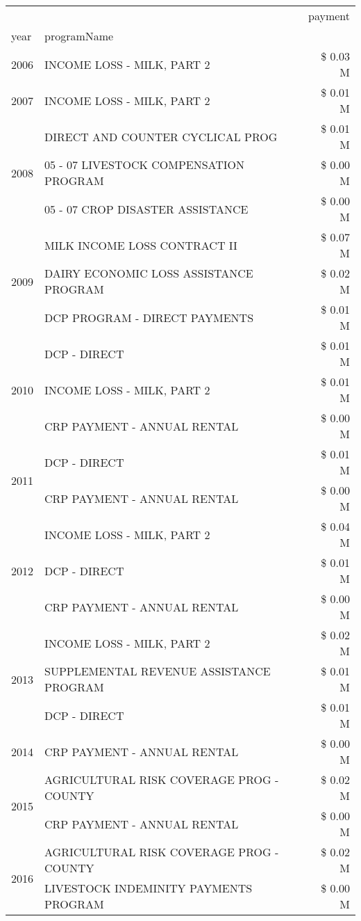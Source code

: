 \begin{tabular}{llr}
\toprule
 &  & payment \\
year & programName &  \\
\midrule
2006 & INCOME LOSS - MILK, PART 2 & \$ 0.03 M \\
\cline{1-3}
2007 & INCOME LOSS - MILK, PART 2 & \$ 0.01 M \\
\cline{1-3}
\multirow[t]{3}{*}{2008} & DIRECT AND COUNTER CYCLICAL PROG & \$ 0.01 M \\
 & 05 - 07 LIVESTOCK COMPENSATION PROGRAM & \$ 0.00 M \\
 & 05 - 07 CROP DISASTER ASSISTANCE & \$ 0.00 M \\
\cline{1-3}
\multirow[t]{3}{*}{2009} & MILK INCOME LOSS CONTRACT II & \$ 0.07 M \\
 & DAIRY ECONOMIC LOSS ASSISTANCE PROGRAM & \$ 0.02 M \\
 & DCP PROGRAM - DIRECT PAYMENTS & \$ 0.01 M \\
\cline{1-3}
\multirow[t]{3}{*}{2010} & DCP - DIRECT & \$ 0.01 M \\
 & INCOME LOSS - MILK, PART 2 & \$ 0.01 M \\
 & CRP PAYMENT - ANNUAL RENTAL & \$ 0.00 M \\
\cline{1-3}
\multirow[t]{2}{*}{2011} & DCP - DIRECT & \$ 0.01 M \\
 & CRP PAYMENT - ANNUAL RENTAL & \$ 0.00 M \\
\cline{1-3}
\multirow[t]{3}{*}{2012} & INCOME LOSS - MILK, PART 2 & \$ 0.04 M \\
 & DCP - DIRECT & \$ 0.01 M \\
 & CRP PAYMENT - ANNUAL RENTAL & \$ 0.00 M \\
\cline{1-3}
\multirow[t]{3}{*}{2013} & INCOME LOSS - MILK, PART 2 & \$ 0.02 M \\
 & SUPPLEMENTAL REVENUE ASSISTANCE PROGRAM & \$ 0.01 M \\
 & DCP - DIRECT & \$ 0.01 M \\
\cline{1-3}
2014 & CRP PAYMENT - ANNUAL RENTAL & \$ 0.00 M \\
\cline{1-3}
\multirow[t]{2}{*}{2015} & AGRICULTURAL RISK COVERAGE PROG - COUNTY & \$ 0.02 M \\
 & CRP PAYMENT - ANNUAL RENTAL & \$ 0.00 M \\
\cline{1-3}
\multirow[t]{3}{*}{2016} & AGRICULTURAL RISK COVERAGE PROG - COUNTY & \$ 0.02 M \\
 & LIVESTOCK INDEMINITY PAYMENTS PROGRAM & \$ 0.00 M \\

\end{tabular}

